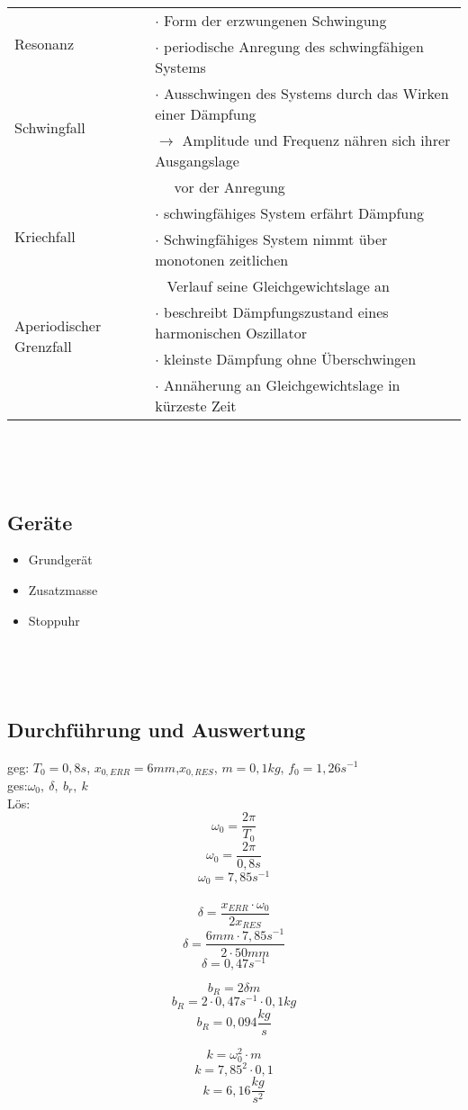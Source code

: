 \documentclass[a4paper,11pt]{scrartcl}
\begin{document}
\begin{tabularx}{\textwidth}{l|l}
		\multirow{2}{*}{Resonanz}&$\cdot$ Form der erzwungenen Schwingung\\
		&$\cdot$ periodische Anregung des schwingfähigen Systems\\
		\hline
		
		\multirow{2}{*}{Schwingfall}&$\cdot$ Ausschwingen des Systems durch das Wirken einer Dämpfung\\
		&$\rightarrow$ Amplitude und Frequenz nähren sich ihrer Ausgangslage\\
		&~~ vor der Anregung\\
		\hline
		
		\multirow{2}{*}{Kriechfall}&$\cdot$ schwingfähiges System erfährt Dämpfung\\
		&$\cdot$ Schwingfähiges System nimmt über monotonen zeitlichen\\
		&~ Verlauf seine Gleichgewichtslage an  \\
		\hline
		 
		\multirow{2}{*}{Aperiodischer Grenzfall}&$\cdot$ beschreibt Dämpfungszustand eines harmonischen Oszillator\\
		& $\cdot$ kleinste Dämpfung ohne Überschwingen\\
		& $\cdot$ Annäherung an Gleichgewichtslage in kürzeste Zeit 
	\end{tabularx}
	\par ~ \par ~
	\subsection*{Geräte} 
	\begin{itemize}
		\item Grundgerät
		\item Zusatzmasse
		\item Stoppuhr
	\end{itemize}
	\par ~ \par ~
	\newpage
	\subsection*{Durchführung und Auswertung}
	 geg: $T_0=0,8s$, $x_{0,ERR}=6mm$,$x_{0,RES}$, $m=0,1kg$, $f_0=1,26s^{-1}$\\
			ges:$\omega_0,~\delta,~b_r,~k$\\
			Lös:\\
			$$\omega_0=\frac{2\pi}{T_0}$$
			$$\omega_0=\frac{2\pi}{0,8s}$$
			$$\omega_0=7,85s^{-1}$$\\
			
			$$\delta=\frac{x_{ERR} \cdot \omega_0}{2x_{RES}}$$
			$$\delta=\frac{6mm\cdot 7,85s^{-1}}{2\cdot50mm}$$
			$$\delta=0,47s^{-1}$$
			
			$$b_R=2\delta m$$
			$$b_R=2\cdot0,47s^{-1}\cdot 0,1kg$$
			$$b_R=0,094\frac{kg}{s}$$
			
			$$k=\omega_0^2\cdot m$$
			$$k=7,85^2\cdot 0,1$$
			 $$k=6,16\frac{kg}{s^2}$$
			
	
	
	
	
\end{document}
